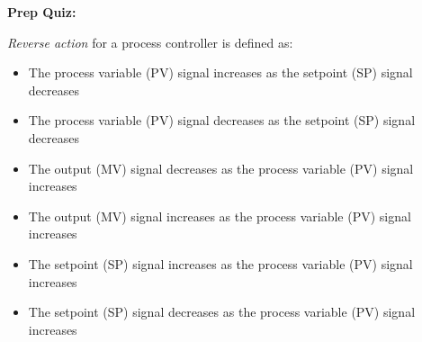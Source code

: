 \vfil \eject

\noindent
{\bf Prep Quiz:}

{\it Reverse action} for a process controller is defined as:

\begin{itemize}
\item{} The process variable (PV) signal increases as the setpoint (SP) signal decreases
\vskip 5pt
\item{} The process variable (PV) signal decreases as the setpoint (SP) signal decreases
\vskip 5pt
\item{} The output (MV) signal decreases as the process variable (PV) signal increases 
\vskip 5pt
\item{} The output (MV) signal increases as the process variable (PV) signal increases
\vskip 5pt
\item{} The setpoint (SP) signal increases as the process variable (PV) signal increases 
\vskip 5pt
\item{} The setpoint (SP) signal decreases as the process variable (PV) signal increases 
\end{itemize}





